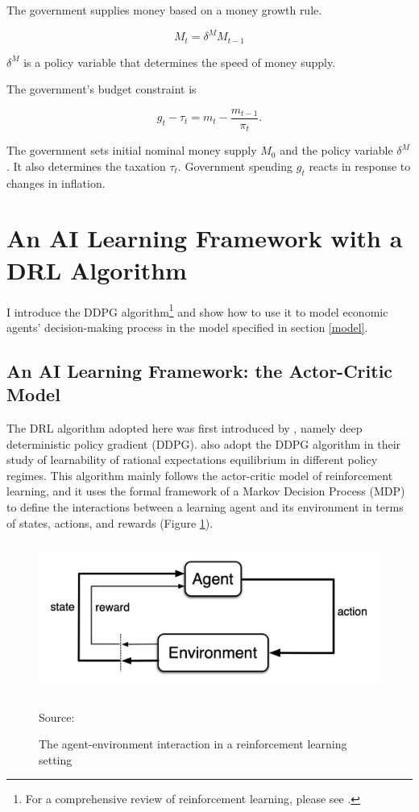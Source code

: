 \documentclass[hidelinks]{article}
\begin{document}
The government supplies money based on a money growth rule.

\begin{equation}
	M_t = \delta^MM_{t-1}
\end{equation}

$\delta^M$ is a policy variable that determines the speed of money supply.

The government's budget constraint is

\begin{equation}
	g_t - \tau_t = m_t - \frac{m_{t-1}}{\pi_{t}}.
	\label{g_bc}
\end{equation}

The government sets initial nominal money supply $M_0$ and the policy variable $\delta^M$. It also determines the taxation $\tau_t$. Government spending $g_t$ reacts in response to changes in inflation.


\section{An AI Learning Framework with a DRL Algorithm}
\label{AI}

I introduce the DDPG algorithm\footnote{For a comprehensive review of reinforcement learning, please see \cite{SB2018}.} and show how to use it to model economic agents' decision-making process in the model specified in section \ref{model}. 


\subsection{An AI Learning Framework: the Actor-Critic Model}
The DRL algorithm adopted here was first introduced by \cite{lillicrap2015drl}, namely deep deterministic policy gradient (DDPG). \cite{Shi2021deep} also adopt the DDPG algorithm in their study of learnability of rational expectations equilibrium in different policy regimes. This algorithm mainly follows the actor-critic model of reinforcement learning, and it uses the formal framework of a Markov Decision Process (MDP) to define the interactions between a learning agent and its environment in terms of states, actions, and rewards (Figure \ref{MDP}).

\vspace{1.5cm}

\begin{figure}[H]	
	\caption{The agent-environment interaction in a reinforcement learning setting}
	\centerline{\includegraphics[width=12cm,height=5cm]{fig1.png}}
	\label{MDP}
	Source: \cite{SB2018}
\end{figure}
\end{document}
